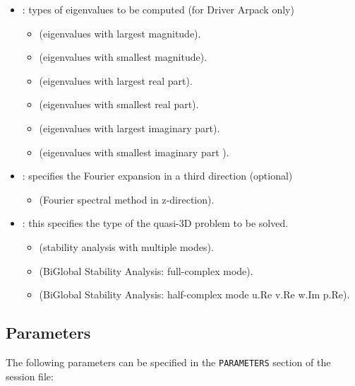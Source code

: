 \begin{itemize}
\item {}: types of eigenvalues to be computed (for Driver Arpack only)
\begin{itemize}
\item {} (eigenvalues with largest magnitude).
\item {} (eigenvalues with smallest magnitude).
\item {} (eigenvalues with largest real part).
\item {} (eigenvalues with smallest real part).
\item {} (eigenvalues with largest imaginary part).
\item {} (eigenvalues with smallest imaginary part ).
\end{itemize}

\item {}: specifies the Fourier expansion in a third direction (optional)
\begin{itemize}
\item {} (Fourier spectral method in z-direction).
\end{itemize}
\item {}: this specifies the type of the quasi-3D problem to be solved.
\begin{itemize}
\item {} (stability analysis with multiple modes).
\item {} (BiGlobal Stability Analysis: full-complex mode).
\item {} (BiGlobal Stability Analysis: half-complex mode u.Re v.Re w.Im p.Re).
\end{itemize}
\end{itemize}


\subsection{Parameters}
The following parameters can be specified in the \texttt{PARAMETERS} section of the session file:

